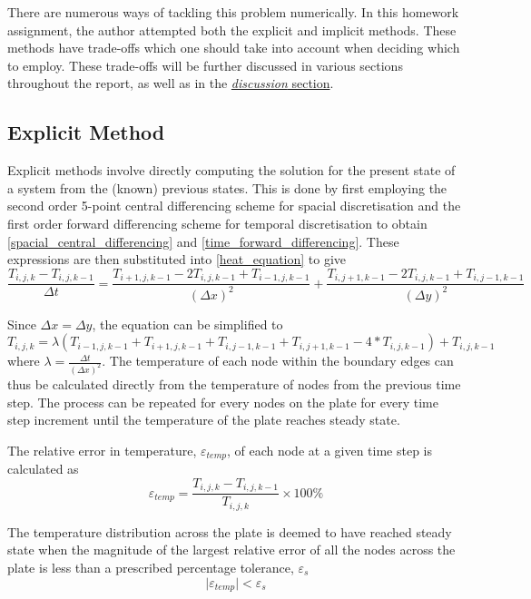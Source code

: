 \documentclass[a4paper]{article}
\begin{document}
	There are numerous ways of tackling this problem numerically. In this homework assignment, the author attempted both the explicit and implicit methods. These methods have trade-offs which one should take into account when deciding which to employ. These trade-offs will be further discussed in various sections throughout the report, as well as in the \hyperref[discussion_section]{\emph{discussion} section}.
	
	\subsection{Explicit Method}
		Explicit methods involve directly computing the solution for the present state of a system from the (known) previous states. This is done by first employing the second order 5-point central differencing scheme for spacial discretisation and the first order forward differencing scheme for temporal discretisation to obtain \autoref{spacial_central_differencing} and \autoref{time_forward_differencing}. These expressions are then substituted into \autoref{heat_equation} to give
		\begin{equation}
			\frac{T_{i,j,k} - T_{i,j,k-1}}{\Delta t}
			=
			\frac{T_{i+1,j,k-1} - 2T_{i,j,k-1} + T_{i-1,j,k-1}}{(\Delta x)^2}
			+ 
			\frac{T_{i,j+1,k-1} - 2T_{i,j,k-1} + T_{i,j-1,k-1}}{(\Delta y)^2}
		\end{equation}
		
		Since $\Delta x = \Delta y$, the equation can be simplified to
		\begin{equation*}
			T_{i,j,k} = \lambda(T_{i-1,j,k-1} + T_{i+1,j,k-1} + T_{i,j-1,k-1} + T_{i,j+1,k-1} - 4*T_{i,j,k-1}) + T_{i,j,k-1}	
		\end{equation*}
		where $\lambda = \displaystyle{\frac{\Delta t}{(\Delta x)^2}}$. The temperature of each node within the boundary edges can thus be calculated directly from the temperature of nodes from the previous time step. The process can be repeated for every nodes on the plate for every time step increment until the temperature of the plate reaches steady state.
		
		The relative error in temperature, $\varepsilon_{temp}$, of each node at a given time step is calculated as
		\begin{equation}
			\varepsilon_{temp} = \frac{T_{i,j,k}-T_{i,j,k-1}}{T_{i,j,k}}\times 100\%
			\label{relative_error_temperature_formula}
		\end{equation}
		
		The temperature distribution across the plate is deemed to have reached steady state when the magnitude of the largest relative error of all the nodes across the plate is less than a prescribed percentage tolerance, $\varepsilon_s$
		\begin{equation*}
			\vert \varepsilon_{temp}\vert
			<
			\varepsilon_s
		\end{equation*}
		
\end{document}
